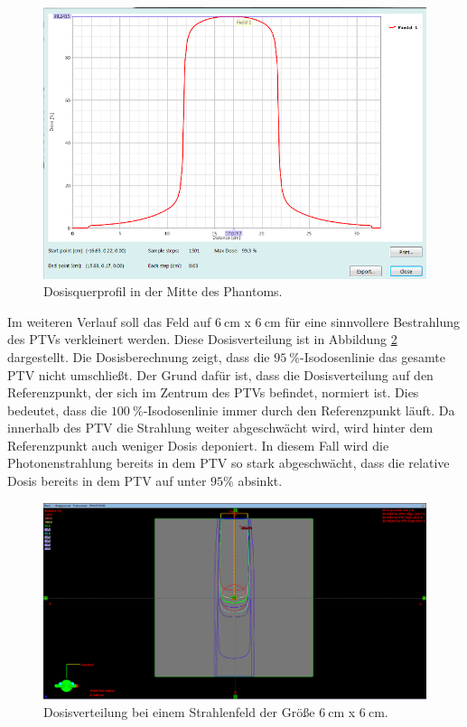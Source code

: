 \begin{figure}[H]
	\centering
	\includegraphics[width=0.7\linewidth]{../../Wasserphantom Bilder/Aufgabe213.png}
	\caption{Dosisquerprofil in der Mitte des Phantoms.}
	\label{fig:aufgabe2}
\end{figure}

Im weiteren Verlauf soll das Feld auf $\SI{6}{\centi\meter}$ x $\SI{6}{\centi\meter}$ für eine sinnvollere Bestrahlung des PTVs  verkleinert werden. Diese Dosisverteilung ist in
Abbildung \ref{fig:a2_4} dargestellt. Die Dosisberechnung zeigt, dass die $\SI{95}{\percent}$-Isodosenlinie das gesamte PTV nicht umschließt.
Der Grund dafür ist, dass die Dosisverteilung auf den Referenzpunkt, der sich im Zentrum des
PTVs befindet, normiert ist. Dies bedeutet, dass die $\SI{100}{\percent}$-Isodosenlinie immer
durch den Referenzpunkt läuft. Da innerhalb des PTV die Strahlung weiter abgeschwächt
wird, wird hinter dem Referenzpunkt auch weniger Dosis deponiert. In diesem
Fall wird die Photonenstrahlung bereits in dem PTV so stark abgeschwächt, dass die
relative Dosis bereits in dem PTV auf unter $95\%$ absinkt.

 \begin{figure}[H]
 	\centering
 	\includegraphics[width=0.7\linewidth]{../../Wasserphantom Bilder/Aufgabe2.1_4.png}
 	\caption{Dosisverteilung bei einem Strahlenfeld der Größe $\SI{6}{\centi\meter}$ x $\SI{6}{\centi\meter}$.}
 	\label{fig:a2_4}
 \end{figure}


